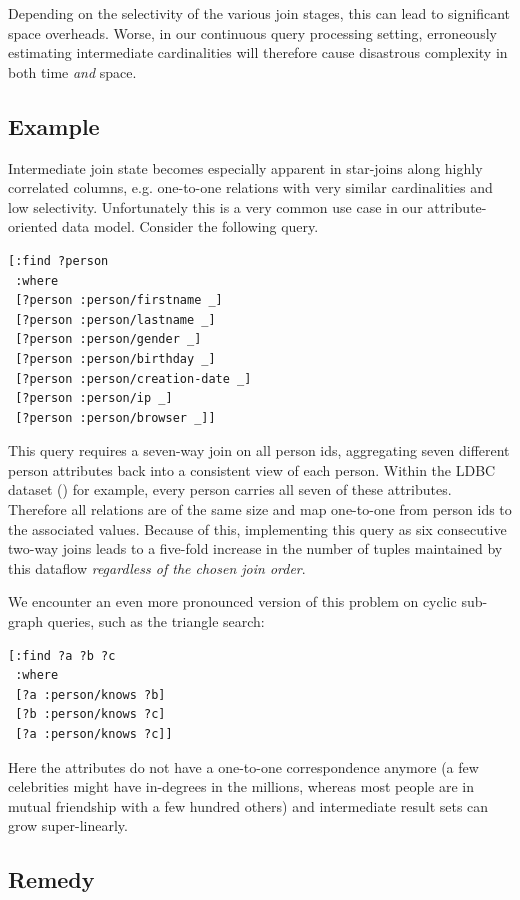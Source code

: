 \documentclass[../catalog.tex]{subfiles}
\begin{document}
Depending on the selectivity of the various join stages, this can lead
to significant space overheads. Worse, in our continuous query
processing setting, erroneously estimating intermediate cardinalities
will therefore cause disastrous complexity in both time \emph{and}
space.

\subsection{Example}

Intermediate join state becomes especially apparent in star-joins
along highly correlated columns, e.g. one-to-one relations with very
similar cardinalities and low selectivity. Unfortunately this is a
very common use case in our attribute-oriented data model. Consider
the following query.

\begin{verbatim}
[:find ?person
 :where
 [?person :person/firstname _]
 [?person :person/lastname _]
 [?person :person/gender _]
 [?person :person/birthday _]
 [?person :person/creation-date _]
 [?person :person/ip _]
 [?person :person/browser _]]
\end{verbatim}

This query requires a seven-way join on all person ids, aggregating
seven different person attributes back into a consistent view of each
person. Within the LDBC dataset (\cite{erling2015ldbc}) for example,
every person carries all seven of these attributes. Therefore all
relations are of the same size and map one-to-one from person ids to
the associated values. Because of this, implementing this query as six
consecutive two-way joins leads to a five-fold increase in the number
of tuples maintained by this dataflow \emph{regardless of the chosen
  join order}.

We encounter an even more pronounced version of this problem on cyclic
sub-graph queries, such as the triangle search:

\begin{verbatim}
[:find ?a ?b ?c
 :where
 [?a :person/knows ?b]
 [?b :person/knows ?c]
 [?a :person/knows ?c]]
\end{verbatim}

Here the attributes do not have a one-to-one correspondence anymore (a
few celebrities might have in-degrees in the millions, whereas most
people are in mutual friendship with a few hundred others) and
intermediate result sets can grow super-linearly.

\subsection{Remedy}
\end{document}
